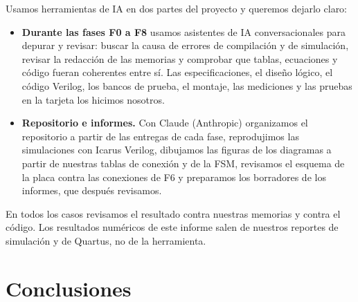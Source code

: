 \documentclass[conference,a4paper]{IEEEtran}
\begin{document}
Usamos herramientas de IA en dos partes del proyecto y queremos dejarlo claro:
\begin{itemize}
\item \textbf{Durante las fases F0 a F8} usamos asistentes de IA conversacionales para depurar y revisar: buscar la causa de errores de compilación y de simulación, revisar la redacción de las memorias y comprobar que tablas, ecuaciones y código fueran coherentes entre sí. Las especificaciones, el diseño lógico, el código Verilog, los bancos de prueba, el montaje, las mediciones y las pruebas en la tarjeta los hicimos nosotros.
\item \textbf{Repositorio e informes.} Con Claude (Anthropic) organizamos el repositorio a partir de las entregas de cada fase, reprodujimos las simulaciones con Icarus Verilog, dibujamos las figuras de los diagramas a partir de nuestras tablas de conexión y de la FSM, revisamos el esquema de la placa contra las conexiones de F6 y preparamos los borradores de los informes, que después revisamos.
\end{itemize}
En todos los casos revisamos el resultado contra nuestras memorias y contra el código. Los resultados numéricos de este informe salen de nuestros reportes de simulación y de Quartus, no de la herramienta.

\section{Conclusiones}
\end{document}
